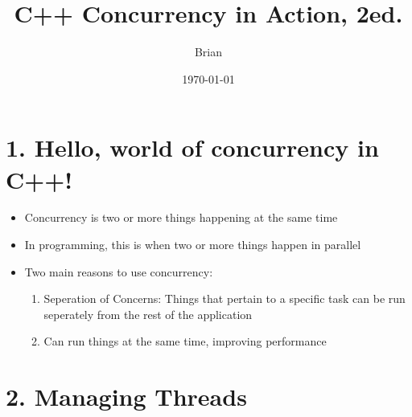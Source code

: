\documentclass[11pt, a4paper]{article}
\title{C++ Concurrency in Action, 2ed.}
\author{Brian}
\date{\today}
\theoremstyle{definition}
\theoremstyle{remark}
\begin{document}
\maketitle
\tableofcontents          %
\newpage


\section{1. Hello, world of concurrency in C++!}
\begin{itemize}
    \item Concurrency is two or more things happening at the same time
    \item In programming, this is when two or more things happen in parallel
    \item Two main reasons to use concurrency:
    \begin{enumerate}
        \item Seperation of Concerns: Things that pertain to a specific task can be run seperately from the rest of the application
        \item Can run things at the same time, improving performance
    \end{enumerate}
\end{itemize}

\section{2. Managing Threads}
\end{document}
